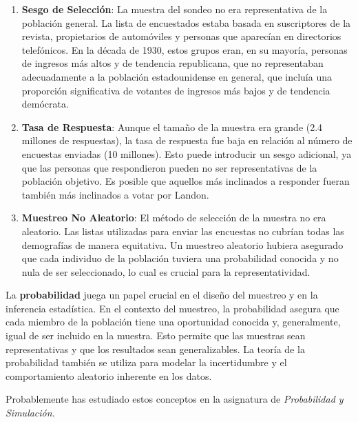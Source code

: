 \documentclass[
  letterpaper,
  DIV=11,
  numbers=noendperiod]{scrreprt}
\begin{document}
\begin{tcolorbox}
\begin{enumerate}
\def\labelenumi{\arabic{enumi}.}
\item
  \textbf{Sesgo de Selección}: La muestra del sondeo no era
  representativa de la población general. La lista de encuestados estaba
  basada en suscriptores de la revista, propietarios de automóviles y
  personas que aparecían en directorios telefónicos. En la década de
  1930, estos grupos eran, en su mayoría, personas de ingresos más altos
  y de tendencia republicana, que no representaban adecuadamente a la
  población estadounidense en general, que incluía una proporción
  significativa de votantes de ingresos más bajos y de tendencia
  demócrata.
\item
  \textbf{Tasa de Respuesta}: Aunque el tamaño de la muestra era grande
  (2.4 millones de respuestas), la tasa de respuesta fue baja en
  relación al número de encuestas enviadas (10 millones). Esto puede
  introducir un sesgo adicional, ya que las personas que respondieron
  pueden no ser representativas de la población objetivo. Es posible que
  aquellos más inclinados a responder fueran también más inclinados a
  votar por Landon.
\item
  \textbf{Muestreo No Aleatorio}: El método de selección de la muestra
  no era aleatorio. Las listas utilizadas para enviar las encuestas no
  cubrían todas las demografías de manera equitativa. Un muestreo
  aleatorio hubiera asegurado que cada individuo de la población tuviera
  una probabilidad conocida y no nula de ser seleccionado, lo cual es
  crucial para la representatividad.
\end{enumerate}

\end{tcolorbox}

La \textbf{probabilidad} juega un papel crucial en el diseño del
muestreo y en la inferencia estadística. En el contexto del muestreo, la
probabilidad asegura que cada miembro de la población tiene una
oportunidad conocida y, generalmente, igual de ser incluido en la
muestra. Esto permite que las muestras sean representativas y que los
resultados sean generalizables. La teoría de la probabilidad también se
utiliza para modelar la incertidumbre y el comportamiento aleatorio
inherente en los datos.

\begin{tcolorbox}[enhanced jigsaw, arc=.35mm, breakable, coltitle=black, left=2mm, opacityback=0, bottomtitle=1mm, colbacktitle=quarto-callout-warning-color!10!white, title=\textcolor{quarto-callout-warning-color}{\faExclamationTriangle}\hspace{0.5em}{Warning}, titlerule=0mm, colback=white, colframe=quarto-callout-warning-color-frame, bottomrule=.15mm, rightrule=.15mm, opacitybacktitle=0.6, toptitle=1mm, toprule=.15mm, leftrule=.75mm]

Probablemente has estudiado estos conceptos en la asignatura de
\emph{Probabilidad y Simulación}.

\end{tcolorbox}
\end{document}
